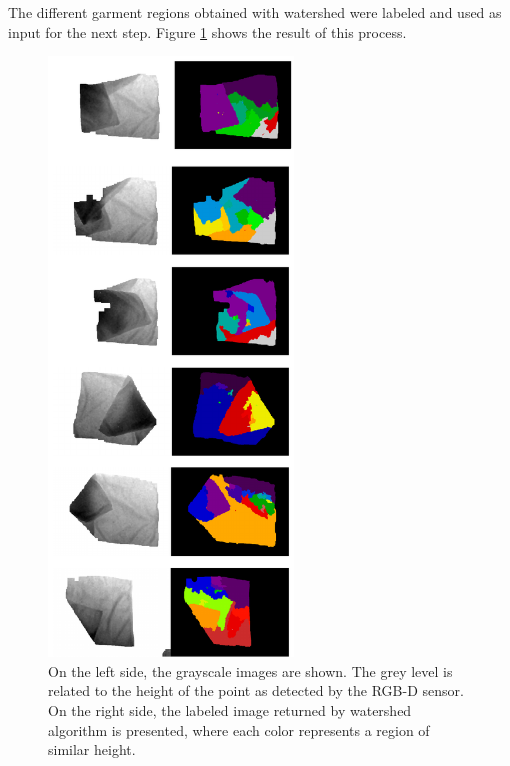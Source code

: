 The different garment regions obtained with watershed were labeled and used as input for the next step. Figure \ref{fig:watershed_labels} shows the result of this process.

\begin{figure}[thpb]
    \centering
    \includegraphics[width=0.58\textwidth]{figures/colour_garment.pdf}
    \caption{On the left side, the grayscale images are shown. The grey level is related to the height of the point as detected by the RGB-D sensor. On the right side, the labeled image returned by watershed algorithm is presented, where each color represents a region of similar height.}
    \label{fig:watershed_labels}
\end{figure}